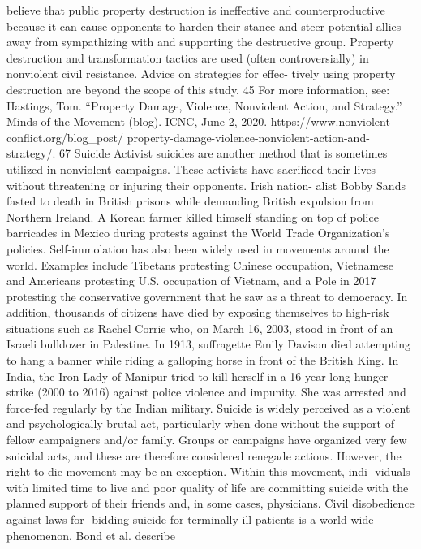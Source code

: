 \documentclass[twoside,a4paper,12pt,fleqn,openany]{extbook}
\begin{document}
believe that public property destruction is ineffective and counterproductive because it can
cause opponents to harden their stance and steer potential allies away from sympathizing
with and supporting the destructive group. Property destruction and transformation tactics
are used (often controversially) in nonviolent civil resistance. Advice on strategies for effec-
tively using property destruction are beyond the scope of this study.
45
For more information, see: Hastings, Tom. “Property Damage, Violence, Nonviolent Action, and Strategy.”
Minds of the Movement (blog). ICNC, June 2, 2020. https://www.nonviolent-conflict.org/blog_post/
property-damage-violence-nonviolent-action-and-strategy/.
67
Suicide
Activist suicides are another method that is sometimes utilized in nonviolent campaigns. These
activists have sacrificed their lives without threatening or injuring their opponents. Irish nation-
alist Bobby Sands fasted to death in British prisons while demanding British expulsion from
Northern Ireland. A Korean farmer killed himself standing on top of police barricades in Mexico
during protests against the World Trade Organization’s policies. Self-immolation has also been
widely used in movements around the world. Examples include Tibetans protesting Chinese
occupation, Vietnamese and Americans protesting U.S. occupation of Vietnam, and a Pole in
2017 protesting the conservative government that he saw as a threat to democracy.
In addition, thousands of citizens have died by exposing themselves to high-risk situations
such as Rachel Corrie who, on March 16, 2003, stood in front of an Israeli bulldozer in Palestine.
In 1913, suffragette Emily Davison died attempting to hang a banner while riding a galloping
horse in front of the British King. In India, the Iron Lady of Manipur tried to kill herself in a
16-year long hunger strike (2000 to 2016) against police violence and impunity. She was
arrested and force-fed regularly by the Indian military.
Suicide is widely perceived as a violent and psychologically brutal act, particularly when
done without the support of fellow campaigners and/or family. Groups or campaigns have
organized very few suicidal acts, and these are therefore considered renegade actions.
However, the right-to-die movement may be an exception. Within this movement, indi-
viduals with limited time to live and poor quality of life are committing suicide with the planned
support of their friends and, in some cases, physicians. Civil disobedience against laws for-
bidding suicide for terminally ill patients is a world-wide phenomenon. Bond et al. describe
\end{document}
